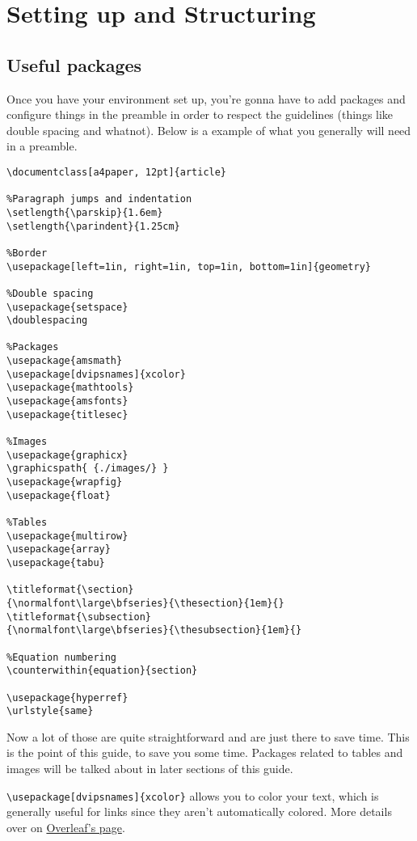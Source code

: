 \section{Setting up and Structuring}
\subsection{Useful packages}
Once you have your environment set up,
you're gonna have to add packages and configure things
in the preamble in order to respect the guidelines
(things like double spacing and whatnot).
Below is a example of what you generally will need in a preamble.
\begin{verbatim}
\documentclass[a4paper, 12pt]{article}

%Paragraph jumps and indentation
\setlength{\parskip}{1.6em}
\setlength{\parindent}{1.25cm}

%Border
\usepackage[left=1in, right=1in, top=1in, bottom=1in]{geometry}

%Double spacing
\usepackage{setspace}
\doublespacing

%Packages
\usepackage{amsmath}
\usepackage[dvipsnames]{xcolor}
\usepackage{mathtools}
\usepackage{amsfonts}
\usepackage{titlesec}

%Images
\usepackage{graphicx}
\graphicspath{ {./images/} }
\usepackage{wrapfig}
\usepackage{float}

%Tables
\usepackage{multirow}
\usepackage{array}
\usepackage{tabu}

\titleformat{\section}
{\normalfont\large\bfseries}{\thesection}{1em}{}
\titleformat{\subsection}
{\normalfont\large\bfseries}{\thesubsection}{1em}{}

%Equation numbering
\counterwithin{equation}{section}

\usepackage{hyperref}
\urlstyle{same}
\end{verbatim}
Now a lot of those are quite straightforward and are just there to save time.
This is the point of this guide, to save you some time.
Packages related to tables and images will be talked about in later sections of this guide.

\verb|\usepackage[dvipsnames]{xcolor}| allows you to color your text,
which is generally useful for links since they aren't automatically colored.
More details over on \href{https://www.overleaf.com/learn/latex/Using_colours_in_LaTeX}{Overleaf's page}.

